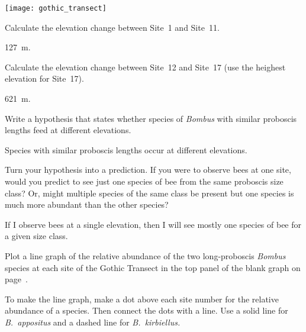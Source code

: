 \documentclass[12pt, hidelinks, twoside]{exam}
\newcommand*\AnswerBox[2]{%
    \parbox[t][#1]{0.92\textwidth}{%
    \begin{solution}#2\end{solution}}
    \vspace{\stretch{1}}
}
\begin{document}
\begin{questions}
\begin{multicols}{2}
\columnbreak

\texttt{[image: gothic\_transect]}

\end{multicols}

%
\bigskip

\question
Calculate the elevation change between Site~1 and Site~11.

\AnswerBox{\baselineskip}{127~m.}

\question
Calculate the elevation change between Site~12 and Site~17 (use the 
heighest elevation for Site~17).

\AnswerBox{\baselineskip}{621~m.}

\question
Write a hypothesis that states whether species of \textit{Bombus} 
with similar proboscis lengths feed at different elevations. 

\AnswerBox{0.1\textheight}{Species with similar proboscis lengths occur at different elevations.}

\question
Turn your hypothesis into a prediction. If you were to observe bees at one site, would you predict
to see just one species of bee from the same proboscis size class? Or, might multiple
species of the same class be present but one species is much more abundant than the other species?

\AnswerBox{0.1\textheight}{If I observe bees at a single elevation, then 
I will see mostly one species of bee for a given size class.}


\question
Plot a line graph of the relative abundance of the two long-proboscis \textit{Bombus} species at each site of the Gothic Transect in the top panel of the blank graph on page~\pageref{fig:relative_abundance}. 

To make the line graph, make a dot above each site number
for the relative abundance of a species. Then connect the dots with a line. Use a solid line for \textit{B.~appositus} and a dashed 
line for \textit{B.~kirbiellus.}


\end{questions}
\end{document}
